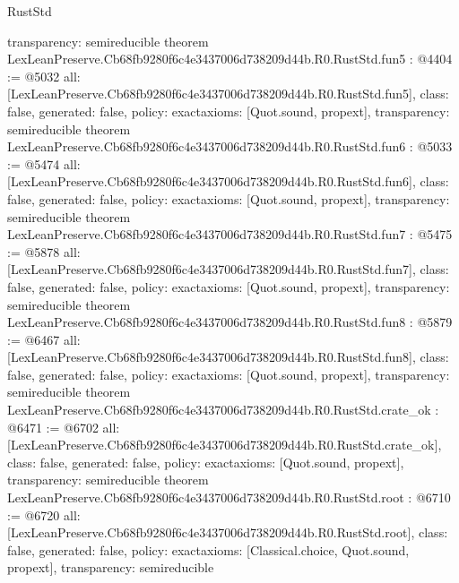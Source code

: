 \begin{lexlean}{RustStd}
\begin{coremodule}
{  transparency: semireducible
}
theorem LexLeanPreserve.Cb68fb9280f6c4e3437006d738209d44b.R0.RustStd.fun5 : @4404 := @5032 {
  all: [LexLeanPreserve.Cb68fb9280f6c4e3437006d738209d44b.R0.RustStd.fun5],
  class: false,
  generated: false,
  policy: exact{axioms: [Quot.sound, propext]},
  transparency: semireducible
}
theorem LexLeanPreserve.Cb68fb9280f6c4e3437006d738209d44b.R0.RustStd.fun6 : @5033 := @5474 {
  all: [LexLeanPreserve.Cb68fb9280f6c4e3437006d738209d44b.R0.RustStd.fun6],
  class: false,
  generated: false,
  policy: exact{axioms: [Quot.sound, propext]},
  transparency: semireducible
}
theorem LexLeanPreserve.Cb68fb9280f6c4e3437006d738209d44b.R0.RustStd.fun7 : @5475 := @5878 {
  all: [LexLeanPreserve.Cb68fb9280f6c4e3437006d738209d44b.R0.RustStd.fun7],
  class: false,
  generated: false,
  policy: exact{axioms: [Quot.sound, propext]},
  transparency: semireducible
}
theorem LexLeanPreserve.Cb68fb9280f6c4e3437006d738209d44b.R0.RustStd.fun8 : @5879 := @6467 {
  all: [LexLeanPreserve.Cb68fb9280f6c4e3437006d738209d44b.R0.RustStd.fun8],
  class: false,
  generated: false,
  policy: exact{axioms: [Quot.sound, propext]},
  transparency: semireducible
}
theorem LexLeanPreserve.Cb68fb9280f6c4e3437006d738209d44b.R0.RustStd.crate_ok : @6471 := @6702 {
  all: [LexLeanPreserve.Cb68fb9280f6c4e3437006d738209d44b.R0.RustStd.crate_ok],
  class: false,
  generated: false,
  policy: exact{axioms: [Quot.sound, propext]},
  transparency: semireducible
}
theorem LexLeanPreserve.Cb68fb9280f6c4e3437006d738209d44b.R0.RustStd.root : @6710 := @6720 {
  all: [LexLeanPreserve.Cb68fb9280f6c4e3437006d738209d44b.R0.RustStd.root],
  class: false,
  generated: false,
  policy: exact{axioms: [Classical.choice, Quot.sound, propext]},
  transparency: semireducible
}


\end{coremodule}
\end{lexlean}
